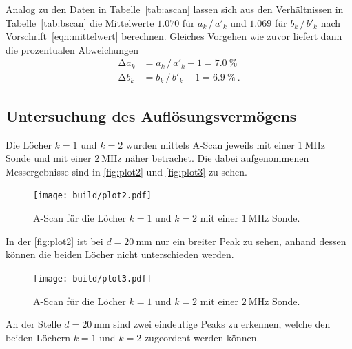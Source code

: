 Analog zu den Daten in Tabelle~\ref{tab:ascan} lassen sich aus den Verhältnissen in Tabelle~\ref{tab:bscan} die Mittelwerte $\num{1.070}$
für $a_k \, / \, a'_k$ und $\num{1.069}$ für $b_k \, / \, b'_k$ nach Vorschrift~\eqref{eqn:mittelwert} berechnen. Gleiches Vorgehen wie
zuvor liefert dann die prozentualen Abweichungen
\begin{align*}
	\increment a_k &= a_k \, / \, a'_k - 1 = \qty{7.0}{\percent} \\
	\increment b_k &= b_k \, / \, b'_k - 1 = \qty{6.9}{\percent} \: .
\end{align*}


\subsection{Untersuchung des Auflösungsvermögens} %
\label{sec:Untersuchung des Auslösungsverfahrens}

Die Löcher $k = 1$ und $k = 2$ wurden mittels A-Scan jeweils mit einer $\SI{1}{\mega\hertz}$ Sonde und mit einer
$\SI{2}{\mega\hertz}$ näher betrachet. Die dabei aufgenommenen Messergebnisse sind in \autoref{fig:plot2} und \autoref{fig:plot3}
zu sehen.

\begin{figure}[H]
	\texttt{[image: build/plot2.pdf]}
	\captionsetup{width=0.765\linewidth}
	\caption{A-Scan für die Löcher $k = 1$ und $k = 2$ mit einer $\SI{1}{\mega\hertz}$ Sonde.}
	\label{fig:plot2}
\end{figure}
In der \autoref{fig:plot2} ist bei $d = \SI{20}{\milli\meter}$ nur ein breiter Peak zu sehen, anhand dessen können die beiden Löcher nicht unterschieden werden.

\begin{figure}[H]
	\texttt{[image: build/plot3.pdf]}
	\captionsetup{width=0.765\linewidth}
	\caption{A-Scan für die Löcher $k = 1$ und $k = 2$ mit einer $\SI{2}{\mega\hertz}$ Sonde.}
	\label{fig:plot3}
\end{figure}
An der Stelle $d = \SI{20}{\milli\meter}$ sind zwei eindeutige Peaks zu erkennen, welche den beiden Löchern $k = 1$ und $k = 2$
zugeordent werden können.

